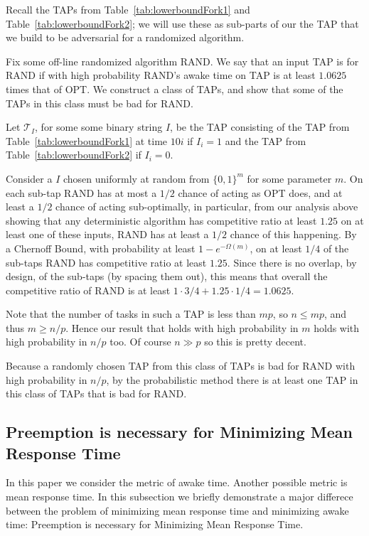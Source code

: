 Recall the TAPs from Table~\ref{tab:lowerboundFork1} and
Table~\ref{tab:lowerboundFork2}; we will use these as sub-parts
of our the TAP that we build to be adversarial for a randomized
algorithm. 

Fix some off-line randomized algorithm RAND. We say that an input
TAP is  for RAND if with high probability RAND's awake
time on TAP is at least $1.0625$ times that of OPT.
We construct a class of TAPs, and show that some of the TAPs in
this class must be bad for RAND.

Let $\mathcal{T}_{I}$, for some some binary string $I$, be the
TAP consisting of the TAP from Table~\ref{tab:lowerboundFork1} at
time $10i$ if $I_i = 1$ and the TAP from
Table~\ref{tab:lowerboundFork2} if $I_i = 0$. 

Consider a $I$ chosen uniformly at random from $\{0,1\}^m$ for
some parameter $m$.
On each sub-tap RAND has at most a $1/2$ chance of acting as OPT
does, and at least a $1/2$ chance of acting sub-optimally, in
particular, from our analysis above showing that any deterministic
algorithm has competitive ratio at least $1.25$ on at least one
of these inputs, RAND has at least a $1/2$ chance of this
happening.
By a Chernoff Bound, with probability at least
$1-e^{-\Omega(m)}$, on at least $1/4$ of the sub-taps RAND has
competitive ratio at least $1.25$. Since there is no overlap, by
design, of the sub-taps (by spacing them out), this means that
overall the competitive ratio of RAND is at least $1\cdot 3/4 +
1.25 \cdot 1/4 = 1.0625.$

Note that the number of tasks in such a TAP is less than $mp$, so
$n \le mp$, and thus $m \ge n/p$.
Hence our result that holds with high probability in $m$ holds
with high probability in $n/p$ too.
Of course $n\gg p$ so this is pretty decent.

Because a randomly chosen TAP from this class of TAPs is bad for
RAND with high probability in $n/p$, by the probabilistic method
there is at least one TAP in this class of TAPs that is bad for
RAND. 

\subsection{Preemption is necessary for Minimizing Mean Response Time}

In this paper we consider the metric of awake time. Another
possible metric is mean response time. In this subsection we
briefly demonstrate a major differece between the problem of
minimizing mean response time and minimizing awake time:
Preemption is necessary for Minimizing Mean Response Time.

